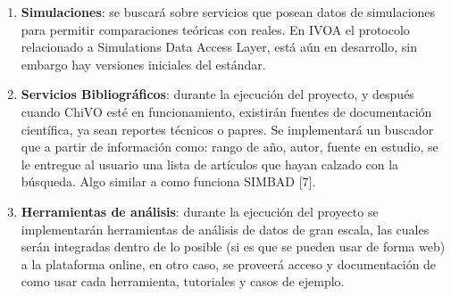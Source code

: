 \begin{enumerate}
	\item \textbf{Simulaciones}: se buscará sobre servicios que posean
datos de simulaciones para permitir comparaciones teóricas con reales. En IVOA
el protocolo relacionado a Simulations Data Access Layer, está aún en
desarrollo, sin embargo hay versiones iniciales del estándar.

	\item \textbf{Servicios Bibliográficos}: durante la ejecución del
proyecto, y después cuando ChiVO esté en funcionamiento, existirán fuentes de
documentación científica, ya sean reportes técnicos o papres. Se implementará
un buscador que a partir de información como: rango de año, autor, fuente en
estudio, se le entregue al usuario una lista de artículos que hayan calzado con
la búsqueda.  Algo similar a como funciona SIMBAD [7].

	\item \textbf{Herramientas de análisis}: durante la ejecución del
proyecto se implementarán herramientas de análisis de datos de gran escala, las
cuales serán integradas dentro de lo posible (si es que se pueden usar de forma
web) a la plataforma online, en otro caso, se proveerá acceso y documentación
de como usar cada herramienta, tutoriales y casos de ejemplo.

\end{enumerate}
